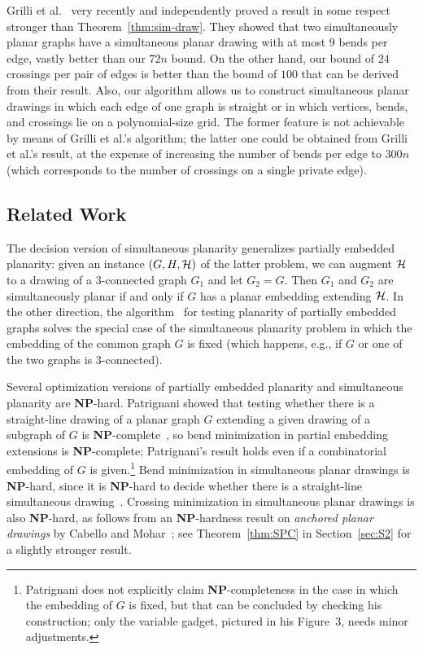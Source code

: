 \documentclass{llncs}
\newcommand{\NP}{\mbox{\bfseries NP}}
\begin{document}
Grilli et al.~\cite{Grilli2014} very recently and independently proved a result in some respect stronger than Theorem~\ref{thm:sim-draw}. They showed that two simultaneously planar graphs have a simultaneous planar drawing with at most $9$ bends per edge, vastly better than our $72n$ bound. On the other hand, our bound of $24$ crossings per pair of edges is better than the bound of $100$ that can be derived from their result. Also, our algorithm allows us to construct simultaneous planar drawings in which each edge of one graph is straight or in which vertices, bends, and crossings lie on a polynomial-size grid. The former feature is not achievable by means of Grilli et al.'s algorithm; the latter one could be obtained from Grilli et al.'s result, at the expense of increasing the number of bends per edge to $300n$ (which corresponds to the number of crossings on a single private edge).

\subsection{Related Work}

The decision version of simultaneous planarity generalizes partially embedded planarity: given an instance $(G,H,\cal H)$ of the latter problem, we can augment $\cal H$ to a drawing of a $3$-connected graph $G_1$ and let $G_2 = G$.  Then $G_1$ and $G_2$ are simultaneously planar if and only if $G$ has a planar embedding extending $\cal H$. In the other direction, the algorithm~\cite{ABFJKPR10} for testing planarity of partially embedded graphs solves the special case of the simultaneous planarity problem in which the embedding of the common graph $G$ is fixed (which happens, e.g., if $G$ or one of the two graphs is $3$-connected).

Several optimization versions of partially embedded planarity and simultaneous planarity are \NP-hard. Patrignani showed that testing whether there is a straight-line drawing of a planar graph $G$ extending a given drawing of a subgraph of $G$ is \NP-complete~\cite{P06}, so bend minimization in partial embedding extensions is \NP-complete; Patrignani's result holds  even if a combinatorial embedding of $G$ is given.\footnote{Patrignani does not explicitly claim \NP-completeness in the case in which the embedding of $G$ is fixed, but that can be concluded by checking his construction; only the variable gadget, pictured in his Figure~3, needs minor adjustments.}
Bend minimization in simultaneous planar drawings is \NP-hard, since it is \NP-hard to decide whether there is a straight-line simultaneous drawing~\cite{EGJPSS08}.
Crossing minimization in simultaneous planar drawings is also \NP-hard, as follows from an \NP-hardness result on \emph{anchored planar drawings} by Cabello and Mohar~\cite{Cabello-Mohar}; see Theorem~\ref{thm:SPC} in Section~\ref{sec:S2} for a slightly stronger result.
\end{document}
